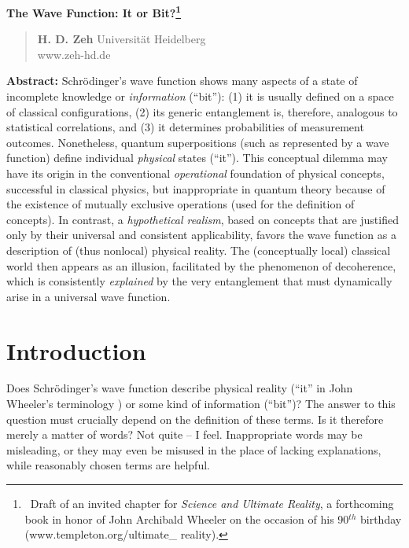 \newcommand{\be}{\begin{equation}}
\newcommand{\ee}{\end{equation}}
\newcommand{\lb}{\label}
\newcommand{\ts}{\hspace{3pt}}

 

 

\vspace*{1.5cm}

\noindent
{\LARGE \bf  	The Wave Function: It or Bit?\footnote{\ Draft of
an invited chapter for {\it Science and Ultimate Reality}, a
forthcoming book in honor of John Archibald Wheeler on the occasion of
his 90$^{th}$ birthday (www.templeton.org/ultimate\_ reality).} }

\vskip 1.5cm
\begin{quote}
\noindent
{\bf H. D. Zeh}
\vskip 0.2cm
\noindent
Universit\"at Heidelberg\\
www.zeh-hd.de
\end{quote}
\vskip 1.8cm



{\bf Abstract:} Schr\"odinger's wave function shows many aspects of a
state of incomplete knowledge or {\it information} (``bit''): (1) it
is usually defined on a space of classical configurations, (2) its
generic entanglement is, therefore, analogous to statistical
correlations, and (3) it determines probabilities of measurement
outcomes. Nonetheless, quantum superpositions (such as represented by
a wave function) define individual {\it physical} states
(``it''). This conceptual dilemma may have its origin in the
conventional {\it operational} foundation of physical concepts,
successful in classical physics, but inappropriate in quantum theory
because of the existence of mutually exclusive operations (used for
the definition of concepts). In contrast, a {\it hypothetical
realism}, based on concepts that are justified only by their universal
and consistent applicability, favors the wave function as a
description of (thus nonlocal) physical reality. The (conceptually
local) classical world then appears as an illusion, facilitated by the
phenomenon of decoherence, which is consistently {\it explained} by
the very entanglement that must dynamically arise in a universal wave
function.


\vfill

 
\section{Introduction}
Does Schr\"odinger's wave function describe physical reality (``it''
in John Wheeler's terminology \cite{timeas}) or some kind of
information (``bit'')? The answer to this question must crucially
depend on the definition of these terms. Is it therefore merely a
matter of words? Not quite -- I feel. Inappropriate words may be
misleading, or they may even be misused in the place of lacking
explanations, while reasonably chosen terms are helpful.

